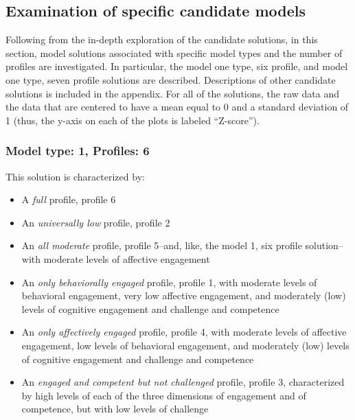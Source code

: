 \documentclass[]{msu-thesis}
\providecommand{\tightlist}{%
  \setlength{\itemsep}{0pt}\setlength{\parskip}{0pt}}
\theoremstyle{definition}
\theoremstyle{definition}
\theoremstyle{definition}
\theoremstyle{remark}
\begin{document}
\subsection{Examination of specific candidate
models}\label{examination-of-specific-candidate-models}

Following from the in-depth exploration of the candidate solutions, in
this section, model solutions associated with specific model types and
the number of profiles are investigated. In particular, the model one
type, six profile, and model one type, seven profile solutions are
described. Descriptions of other candidate solutions is included in the
appendix. For all of the solutions, the raw data and the data that are
centered to have a mean equal to 0 and a standard deviation of 1 (thus,
the y-axis on each of the plots is labeled ``Z-score'').

\subsubsection{Model type: 1, Profiles:
6}\label{model-type-1-profiles-6}

This solution is characterized by:

\begin{itemize}
\tightlist
\item
  A \emph{full} profile, profile 6
\item
  An \emph{universally low} profile, profile 2
\item
  An \emph{all moderate} profile, profile 5--and, like, the model 1, six
  profile solution--with moderate levels of affective engagement
\item
  An \emph{only behaviorally engaged} profile, profile 1, with moderate
  levels of behavioral engagement, very low affective engagement, and
  moderately (low) levels of cognitive engagement and challenge and
  competence
\item
  An \emph{only affectively engaged} profile, profile 4, with moderate
  levels of affective engagement, low levels of behavioral engagement,
  and moderately (low) levels of cognitive engagement and challenge and
  competence
\item
  An \emph{engaged and competent but not challenged} profile, profile 3,
  characterized by high levels of each of the three dimensions of
  engagement and of competence, but with low levels of challenge
\end{itemize}
\end{document}
